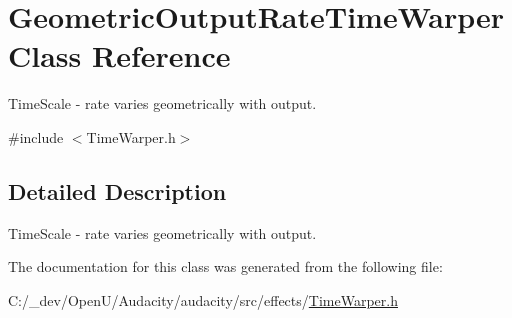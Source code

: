 \hypertarget{class_geometric_output_rate_time_warper}{}\section{Geometric\+Output\+Rate\+Time\+Warper Class Reference}
\label{class_geometric_output_rate_time_warper}


Time\+Scale -\/ rate varies geometrically with output.  




{\ttfamily \#include $<$Time\+Warper.\+h$>$}



\subsection{Detailed Description}
Time\+Scale -\/ rate varies geometrically with output. 

The documentation for this class was generated from the following file\+:\begin{DoxyCompactItemize}
\item 
C\+:/\+\_\+dev/\+Open\+U/\+Audacity/audacity/src/effects/\hyperlink{_time_warper_8h}{Time\+Warper.\+h}\end{DoxyCompactItemize}
